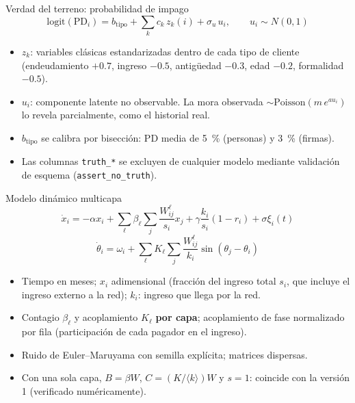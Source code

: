 \documentclass[aspectratio=169,10pt]{beamer}
\begin{document}
\begin{frame}{Verdad del terreno: probabilidad de impago}
\[
\mathrm{logit}(\mathrm{PD}_i) = b_\text{tipo} + \sum_k c_k\,z_k(i) + \sigma_u\,u_i,\qquad u_i\sim N(0,1)
\]
\begin{itemize}
\item $z_k$: variables clásicas estandarizadas dentro de cada tipo de cliente
(endeudamiento $+0.7$, ingreso $-0.5$, antigüedad $-0.3$, edad $-0.2$, formalidad
$-0.5$).
\item $u_i$: componente latente no observable. La mora observada
$\sim\mathrm{Poisson}(m\,e^{a u_i})$ lo revela parcialmente, como el historial real.
\item $b_\text{tipo}$ se calibra por bisección: PD media de 5~\% (personas) y 3~\%
(firmas).
\item Las columnas \texttt{truth\_*} se excluyen de cualquier modelo mediante validación
de esquema (\texttt{assert\_no\_truth}).
\end{itemize}
\end{frame}

\begin{frame}{Modelo dinámico multicapa}
\[
\dot x_i = -\alpha x_i + \sum_\ell\beta_\ell\sum_j\frac{W^\ell_{ij}}{s_i}x_j
+ \gamma\frac{k_i}{s_i}(1-r_i) + \sigma\xi_i(t)
\]
\[
\dot\theta_i = \omega_i + \sum_\ell K_\ell\sum_j\frac{W^\ell_{ij}}{k_i}\sin(\theta_j-\theta_i)
\]
\begin{itemize}
\item Tiempo en meses; $x_i$ adimensional (fracción del ingreso total $s_i$, que incluye
el ingreso externo a la red); $k_i$: ingreso que llega por la red.
\item Contagio $\beta_\ell$ y acoplamiento $K_\ell$ \textbf{por capa}; acoplamiento de
fase normalizado por fila (participación de cada pagador en el ingreso).
\item Ruido de Euler–Maruyama con semilla explícita; matrices dispersas.
\item Con una sola capa, $B=\beta W$, $C=(K/\langle k\rangle)W$ y $s=1$: coincide con la
versión 1 (verificado numéricamente).
\end{itemize}
\end{frame}
\end{document}

